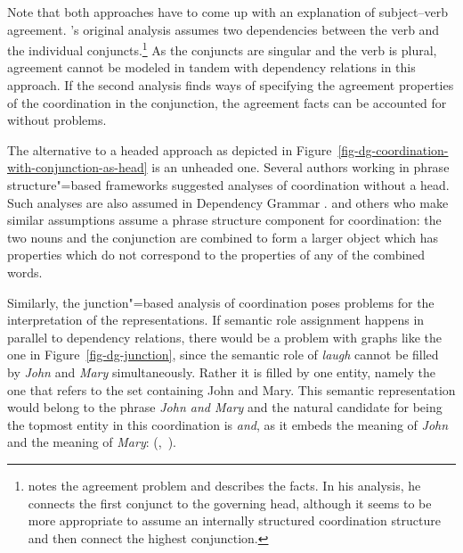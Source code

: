 Note that both approaches have to come up with an explanation of subject--verb agreement. \tes's
original analysis assumes two dependencies between the verb and the individual conjuncts.\footnote{%
  \citet[]{Eroms2000a} notes the agreement problem and describes the facts. In his
  analysis, he connects the first conjunct to the governing head, although it seems to be more
  appropriate to assume an internally structured coordination structure and then connect the highest conjunction.
} As the conjuncts are singular and the verb is plural, agreement cannot be modeled in tandem with dependency
relations in this approach. 
If the second analysis finds ways of specifying the agreement properties
of the coordination in the conjunction, the agreement facts can be accounted for without problems.

The alternative to a headed approach as depicted in Figure~\ref{fig-dg-coordination-with-conjunction-as-head} is an unheaded one. Several authors
working in phrase structure"=based frameworks suggested analyses of coordination without a
head. Such analyses are also assumed in Dependency Grammar
\citep{Hudson88a,Kahane97a}. \citet{Hudson88a} and others who make similar assumptions assume a phrase structure component for
coordination: 
the two nouns and the conjunction are combined to form a larger object which has properties which
do not correspond to the properties of any of the combined words.


Similarly, the junction"=based analysis of coordination poses problems for the interpretation of the
representations. If semantic role assignment happens in parallel to dependency relations, there would be a
problem with graphs like the one in Figure~\ref{fig-dg-junction}, since the semantic role of \emph{laugh} cannot be
filled by \emph{John} and \emph{Mary} simultaneously. Rather it is filled by one entity, namely the
one that refers to the set containing John and Mary. This semantic representation would belong to
the phrase \emph{John and Mary} and the natural candidate for being the topmost entity in this
coordination is \emph{and}, as it embeds the meaning of \emph{John} and the meaning of
\emph{Mary}: (,~).

